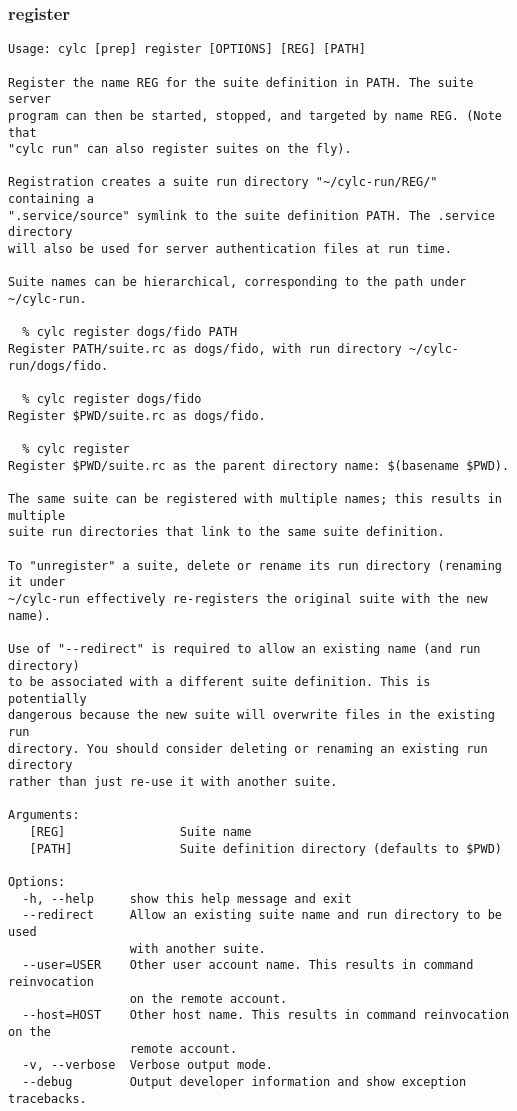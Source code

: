 \subsubsection{register}
\label{register}
\begin{lstlisting}
Usage: cylc [prep] register [OPTIONS] [REG] [PATH] 

Register the name REG for the suite definition in PATH. The suite server
program can then be started, stopped, and targeted by name REG. (Note that
"cylc run" can also register suites on the fly).

Registration creates a suite run directory "~/cylc-run/REG/" containing a
".service/source" symlink to the suite definition PATH. The .service directory
will also be used for server authentication files at run time.

Suite names can be hierarchical, corresponding to the path under ~/cylc-run.

  % cylc register dogs/fido PATH
Register PATH/suite.rc as dogs/fido, with run directory ~/cylc-run/dogs/fido.

  % cylc register dogs/fido
Register $PWD/suite.rc as dogs/fido.

  % cylc register
Register $PWD/suite.rc as the parent directory name: $(basename $PWD).

The same suite can be registered with multiple names; this results in multiple
suite run directories that link to the same suite definition.

To "unregister" a suite, delete or rename its run directory (renaming it under
~/cylc-run effectively re-registers the original suite with the new name).

Use of "--redirect" is required to allow an existing name (and run directory)
to be associated with a different suite definition. This is potentially
dangerous because the new suite will overwrite files in the existing run
directory. You should consider deleting or renaming an existing run directory
rather than just re-use it with another suite.

Arguments:
   [REG]                Suite name
   [PATH]               Suite definition directory (defaults to $PWD)

Options:
  -h, --help     show this help message and exit
  --redirect     Allow an existing suite name and run directory to be used
                 with another suite.
  --user=USER    Other user account name. This results in command reinvocation
                 on the remote account.
  --host=HOST    Other host name. This results in command reinvocation on the
                 remote account.
  -v, --verbose  Verbose output mode.
  --debug        Output developer information and show exception tracebacks.
\end{lstlisting}
